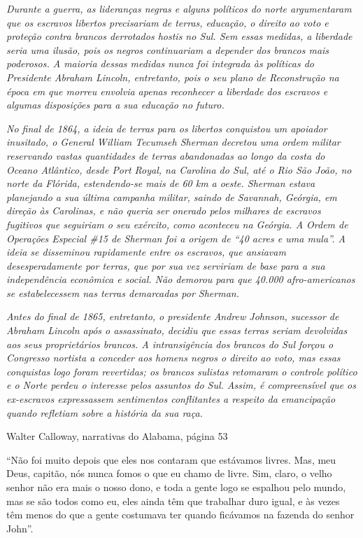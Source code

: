\emph{Durante a guerra, as lideranças negras e alguns políticos do norte
argumentaram que os escravos libertos precisariam de terras, educação, o
direito ao voto e proteção contra brancos derrotados hostis no Sul. Sem
essas medidas, a liberdade seria uma ilusão, pois os negros continuariam
a depender dos brancos mais poderosos. A maioria dessas medidas nunca
foi integrada às políticas do Presidente Abraham Lincoln, entretanto,
pois o seu plano de Reconstrução na época em que morreu envolvia apenas
reconhecer a liberdade dos escravos e algumas disposições para a sua
educação no futuro.}

\emph{No final de 1864, a ideia de terras para os libertos conquistou um
apoiador inusitado, o General William Tecumseh Sherman decretou uma
ordem militar reservando vastas quantidades de terras abandonadas ao
longo da costa do Oceano Atlântico, desde Port Royal, na Carolina do
Sul, até o Rio São João, no norte da Flórida, estendendo-se mais de 60
km a oeste. Sherman estava planejando a sua última campanha militar,
saindo de Savannah, Geórgia, em direção às Carolinas, e não queria ser
onerado pelos milhares de escravos fugitivos que seguiriam o seu
exército, como aconteceu na Geórgia. A Ordem de Operações Especial \#15
de Sherman foi a origem de ``40 acres e uma mula''. A ideia se
disseminou rapidamente entre os escravos, que ansiavam desesperadamente
por terras, que por sua vez serviriam de base para a sua independência
econômica e social. Não demorou para que 40.000 afro-americanos se
estabelecessem nas terras demarcadas por Sherman.}

\emph{Antes do final de 1865, entretanto, o presidente Andrew Johnson,
sucessor de Abraham Lincoln após o assassinato, decidiu que essas terras
seriam devolvidas aos seus proprietários brancos. A intransigência dos
brancos do Sul forçou o Congresso nortista a conceder aos homens negros
o direito ao voto, mas essas conquistas logo foram revertidas; os
brancos sulistas retomaram o controle político e o Norte perdeu o
interesse pelos assuntos do Sul. Assim, é compreensível que os
ex-escravos expressassem sentimentos conflitantes a respeito da
emancipação quando refletiam sobre a história da sua raça.}

Walter Calloway, narrativas do Alabama, página 53

``Não foi muito depois que eles nos contaram que estávamos livres. Mas,
meu Deus, capitão, nós nunca fomos o que eu chamo de livre. Sim, claro,
o velho senhor não era mais o nosso dono, e toda a gente logo se
espalhou pelo mundo, mas se são todos como eu, eles ainda têm que
trabalhar duro igual, e às vezes têm menos do que a gente costumava ter
quando ficávamos na fazenda do senhor John''.

